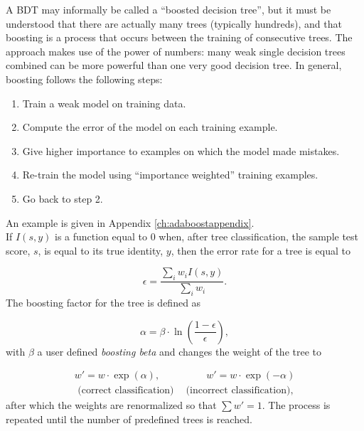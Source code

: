 A BDT may informally be called a ``boosted decision tree'', but it must be understood that there are actually many trees (typically hundreds), and that boosting is a process that occurs between the training of consecutive trees. The approach makes use of the power of numbers: many weak single decision trees combined can be more powerful than one very good decision tree. In general, boosting follows the following steps:
\vspace{2mm}

\begin{enumerate}
\item Train a weak model on training data.
\item Compute the error of the model on each training example.
\item Give higher importance to examples on which the model made mistakes.
\item Re-train the model using ``importance weighted'' training examples.
\item Go back to step 2.
\end{enumerate}
\vspace{2mm}
An example is given in Appendix \ref{ch:adaboostappendix}.\\
\newline
\noindent If $I(s,y)$ is a function equal to 0 when, after tree classification, the sample test score, $s$, is equal to its true identity, $y$, then the error rate for a tree is equal to

\begin{equation}
\epsilon = \frac{\sum_i w_i I(s,y)}{\sum_i w_i}.
\end{equation}
\noindent The boosting factor for the tree is defined as

\begin{equation}
\label{eq:boostfactor}
\alpha = \beta \cdot \ln\left(\frac{1-\epsilon}{\epsilon}\right),
\end{equation}
\noindent with $\beta$ a user defined \textit{boosting beta} and changes the weight of the tree to

\begin{equation}
\begin{split}
w' = w \cdot \exp(\alpha), \ \ \ \ \ \ \ \ \ \ \ \ \ \ \ \ \ \ \ \ \ w' = w \cdot \exp(-\alpha)\\
\textrm{ (correct classification)} \ \ \ \ \textrm{ (incorrect classification),}
\end{split}
\end{equation}
\noindent after which the weights are renormalized so that $\sum w' = 1$. The process is repeated until the number of predefined trees is reached.

